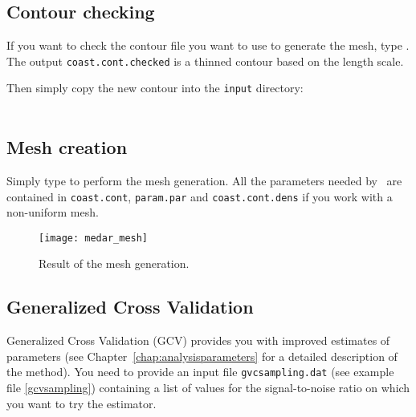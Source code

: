 \subsection{Contour checking}

If you want to check the contour file you want to use to generate the mesh, type . The output \texttt{coast.cont.checked} is a thinned contour based on the length scale.


Then simply copy the new contour into the \texttt{input} directory:\\
\\


\subsection{Mesh creation}

Simply type  to perform the mesh generation. All the parameters needed by \diva\, are contained in \texttt{coast.cont}, \texttt{param.par} and \texttt{coast.cont.dens} if you work with a non-uniform mesh.
%
%


\begin{figure}[htpb]
\centering
\parbox{.65\textwidth}{
\texttt{[image: medar\_mesh]}
}\parbox{.35\textwidth}{
\caption{Result of the mesh generation.\label{divameshCL2}}
}
\end{figure}


\subsection{Generalized Cross Validation}

Generalized Cross Validation (GCV) provides you with improved estimates of parameters (see Chapter~\ref{chap:analysisparameters} for a detailed description of the method). You need to provide an input file \texttt{gvcsampling.dat} (see example file \ref{gcvsampling}) containing a list of values for the signal-to-noise ratio on which you want to try the estimator.

